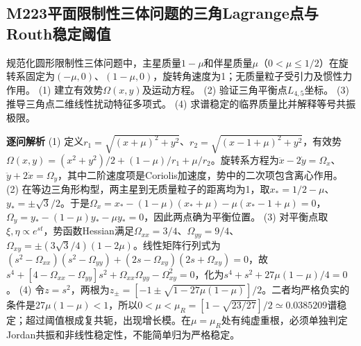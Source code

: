 \subsection*{M223\quad 平面限制性三体问题的三角Lagrange点与Routh稳定阈值}
规范化圆形限制性三体问题中，主星质量$1-\mu$和伴星质量$\mu$（$0<\mu\le1/2$）在旋转系固定为$(-\mu,0)$、$(1-\mu,0)$，旋转角速度为1；无质量粒子受引力及惯性力作用。
(1) 建立有效势$\Omega(x,y)$及运动方程。
(2) 验证三角平衡点$L_{4,5}$坐标。
(3) 推导三角点二维线性扰动特征多项式。
(4) 求谱稳定的临界质量比并解释等号共振极限。
\par\textbf{逐问解析}
(1) 定义$r_1=\sqrt{(x+\mu)^2+y^2}$、$r_2=\sqrt{(x-1+\mu)^2+y^2}$，有效势$\Omega(x,y)=(x^2+y^2)/2+(1-\mu)/r_1+\mu/r_2$。旋转系方程为$\ddot x-2\dot y=\Omega_x$、$\ddot y+2\dot x=\Omega_y$，其中二阶速度项是Coriolis加速度，势中的二次项包含离心作用。
(2) 在等边三角形构型，两主星到无质量粒子的距离均为1，取$x_*=1/2-\mu$、$y_*=\pm\sqrt3/2$。于是$\Omega_x=x_*-(1-\mu)(x_*+\mu)-\mu(x_*-1+\mu)=0$，$\Omega_y=y_*-(1-\mu)y_*-\mu y_*=0$，因此两点确为平衡位置。
(3) 对平衡点取$\xi,\eta\propto e^{st}$，势函数Hessian满足$\Omega_{xx}=3/4$、$\Omega_{yy}=9/4$、$\Omega_{xy}=\pm(3\sqrt3/4)(1-2\mu)$。线性矩阵行列式为$(s^2-\Omega_{xx})(s^2-\Omega_{yy})+(2s-\Omega_{xy})(2s+\Omega_{xy})=0$，故$s^4+[4-\Omega_{xx}-\Omega_{yy}]s^2+\Omega_{xx}\Omega_{yy}-\Omega_{xy}^2=0$，化为$s^4+s^2+27\mu(1-\mu)/4=0$。
(4) 令$z=s^2$，两根为$z_\pm=[-1\pm\sqrt{1-27\mu(1-\mu)}]/2$。二者均严格负实的条件是$27\mu(1-\mu)<1$，所以$0<\mu<\mu_R=[1-\sqrt{23/27}]/2\simeq0.0385209$谱稳定；超过阈值根成复共轭，出现增长模。在$\mu=\mu_R$处有纯虚重根，必须单独判定Jordan共振和非线性稳定性，不能简单归为严格稳定。
\par\medskip
